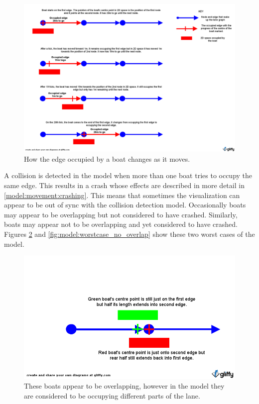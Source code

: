       \begin{figure}
      \begin{center}
      	\includegraphics[scale=0.3]{images/edgeoccupation.png}
      	\caption{How the edge occupied by a boat changes as it moves.}
      	\label{fig:model:edgeoccupation}
      \end{center}
      \end{figure}
      
      A collision is detected in the model when more than one boat tries to occupy the same edge. This results in a crash whose effects are described in more detail in \ref{model:movement:crashing}. This means that sometimes the visualization can appear to be out of sync with the collision detection model. Occasionally boats may appear to be overlapping but not considered to have crashed. Similarly, boats may appear not to be overlapping and yet considered to have crashed. Figures \ref{fig:model:worstcase_overlapping} and \ref{fig:model:worstcase_no_overlap} show these two worst cases of the model.
      
      \begin{figure}
      \begin{center}
      	\includegraphics[scale=0.3]{images/overlap_worst_case.png}
      	\caption{These boats appear to be overlapping, however in the model they are considered to be occupying different parts of the lane.}
      	\label{fig:model:worstcase_overlapping}
      \end{center}
      \end{figure}
      
